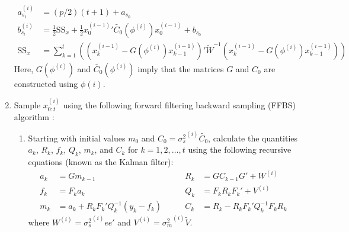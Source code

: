\documentclass{article}
\begin{document}
\begin{enumerate}
\begin{align*}
a_{s_t}^{(i)} &= (p/2)(t+1) + a_{s_0} \\
b_{s_t}^{(i)} &= \frac{1}{2}\mbox{SS}_x + \frac{1}{2}{x_0^{(i-1)}}'\tilde{C_0}(\phi^{(i)})x_0^{(i-1)} + b_{s_0} \\
\mbox{SS}_x &= \sum^t_{k=1} \left((x_k^{(i-1)} - G(\phi^{(i)})x_{k-1}^{(i-1)})'\tilde{W}^{-1}(x_k^{(i-1)} - G(\phi^{(i)})x_{k-1}^{(i-1)})\right)
\end{align*}
\noindent Here, $G(\phi^{(i)})$ and $\tilde{C_0}(\phi^{(i)})$ imply that the matrices $G$ and $C_0$ are constructed using $\phi{(i)}$.
\item Sample $x_{0:t}^{(i)}$ using the following forward filtering backward sampling (FFBS) algorithm \citep{petris2009dynamic}:
\begin{enumerate}
\item Starting with initial values $m_0$ and $C_0 = {\sigma^2_s}^{(i)}\tilde{C_0}$, calculate the quantities $a_k$, $R_k$, $f_k$, $Q_k$, $m_k$, and $C_k$ for $k = 1,2,\ldots,t$ using the following recursive equations (known as the Kalman filter):
    \begin{align*}
    a_k &= Gm_{k-1} &\qquad R_k &= GC_{k-1}G' + W^{(i)} \\
    f_k &= F_ka_k &\qquad Q_k &= F_kR_kF_k' + V^{(i)} \\
    m_k &= a_k + R_kF_k'Q_k^{-1}(y_k-f_k) &\qquad C_k &= R_k - R_kF_k'Q_k^{-1}F_kR_k
    \end{align*}
    \noindent where $W^{(i)} = {\sigma^2_s}^{(i)}ee'$ and $V^{(i)} = {\sigma^2_m}^{(i)}\tilde{V}$.
\end{enumerate}
\end{enumerate}

\clearpage



\end{document}
